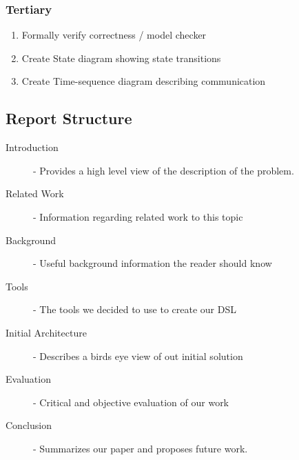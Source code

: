 \subsubsection{Tertiary}
\begin{enumerate}
    \item Formally verify correctness / model checker
    \item Create State diagram showing state transitions
    \item Create Time-sequence diagram describing communication
\end{enumerate}


\subsection{Report Structure}
\begin{description}
  \item[Introduction] - Provides a high level view of the description of the problem.
  \item[Related Work] - Information regarding related work to this topic
  \item[Background] - Useful background information the reader should know
  \item[Tools] - The tools we decided to use to create our DSL
  \item[Initial Architecture] - Describes a birds eye view of out initial solution
  \item[Evaluation] - Critical and objective evaluation of our work 
  \item[Conclusion] - Summarizes our paper and proposes future work.
\end{description}








